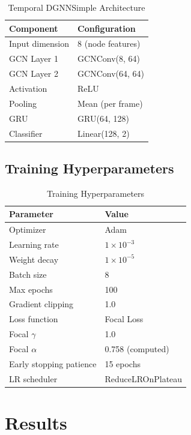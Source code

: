 \begin{table}[H]
\centering
\caption{Temporal DGNNSimple Architecture}
\label{tab:model_config}
\begin{tabular}{ll}
\toprule
\textbf{Component} & \textbf{Configuration} \\
\midrule
Input dimension & 8 (node features) \\
GCN Layer 1 & GCNConv(8, 64) \\
GCN Layer 2 & GCNConv(64, 64) \\
Activation & ReLU \\
Pooling & Mean (per frame) \\
GRU & GRU(64, 128) \\
Classifier & Linear(128, 2) \\
\bottomrule
\end{tabular}
\end{table}

\subsection{Training Hyperparameters}

\begin{table}[H]
\centering
\caption{Training Hyperparameters}
\label{tab:hyperparams}
\begin{tabular}{ll}
\toprule
\textbf{Parameter} & \textbf{Value} \\
\midrule
Optimizer & Adam \\
Learning rate & $1 \times 10^{-3}$ \\
Weight decay & $1 \times 10^{-5}$ \\
Batch size & 8 \\
Max epochs & 100 \\
Gradient clipping & 1.0 \\
\midrule
Loss function & Focal Loss \\
Focal $\gamma$ & 1.0 \\
Focal $\alpha$ & 0.758 (computed) \\
\midrule
Early stopping patience & 15 epochs \\
LR scheduler & ReduceLROnPlateau \\
\bottomrule
\end{tabular}
\end{table}

\section{Results}

